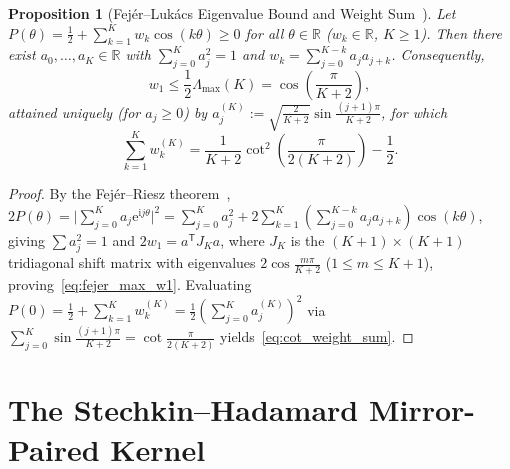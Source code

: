 \documentclass[11pt,reqno]{amsart}
\newtheorem{proposition}[theorem]{Proposition}
\theoremstyle{definition}
\theoremstyle{remark}
\numberwithin{equation}{section}
\newcommand{\R}{\mathbb{R}}
\newcommand{\ii}{\mathrm{i}}
\newcommand{\ee}{\mathrm{e}}
\begin{document}
\begin{proposition}[Fej\'er--Luk\'acs Eigenvalue Bound and Weight Sum~\cite{fejer1916,szego1975,kondratiev1977}]\label{prop:fejer_toeplitz}
Let $P(\theta) = \frac{1}{2} + \sum_{k=1}^K w_k\cos(k\theta) \ge 0$ for all $\theta \in \R$ ($w_k \in \R$, $K \ge 1$). Then there exist $a_0, \dots, a_K \in \R$ with $\sum_{j=0}^K a_j^2 = 1$ and $w_k = \sum_{j=0}^{K-k} a_j a_{j+k}$. Consequently,
\begin{equation}\label{eq:fejer_max_w1}
w_1 \le \frac{1}{2}\Lambda_{\max}(K) = \cos\!\left(\frac{\pi}{K+2}\right),
\end{equation}
attained uniquely (for $a_j \ge 0$) by $a_j^{(K)} := \sqrt{\frac{2}{K+2}}\sin\frac{(j+1)\pi}{K+2}$, for which
\begin{equation}\label{eq:cot_weight_sum}
\sum_{k=1}^K w_k^{(K)} = \frac{1}{K+2}\cot^2\!\left(\frac{\pi}{2(K+2)}\right) - \frac{1}{2}.
\end{equation}
\end{proposition}

\begin{proof}
By the Fej\'er--Riesz theorem~\cite[Thm.~1.2.1]{szego1975}, $2P(\theta) = \lvert\sum_{j=0}^K a_j\ee^{\ii j\theta}\rvert^2 = \sum_{j=0}^K a_j^2 + 2\sum_{k=1}^K (\sum_{j=0}^{K-k} a_j a_{j+k})\cos(k\theta)$, giving $\sum a_j^2 = 1$ and $2w_1 = a^{\mathsf{T}}J_K a$, where $J_K$ is the $(K+1) \times (K+1)$ tridiagonal shift matrix with eigenvalues $2\cos\frac{m\pi}{K+2}$ ($1 \le m \le K+1$), proving~\eqref{eq:fejer_max_w1}. Evaluating $P(0) = \frac{1}{2} + \sum_{k=1}^K w_k^{(K)} = \frac{1}{2}(\sum_{j=0}^K a_j^{(K)})^2$ via $\sum_{j=0}^K \sin\frac{(j+1)\pi}{K+2} = \cot\frac{\pi}{2(K+2)}$ yields~\eqref{eq:cot_weight_sum}.
\end{proof}

\section{The Stechkin--Hadamard Mirror-Paired Kernel}\label{sec:stechkin}
\end{document}
